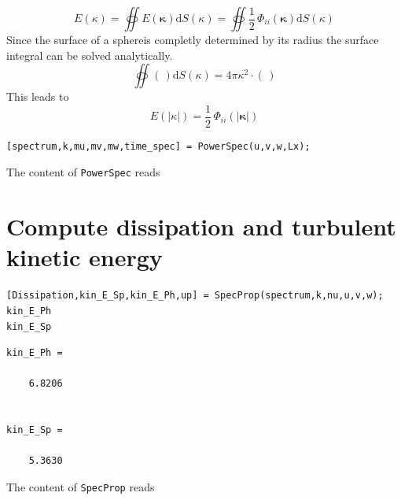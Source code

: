 \documentclass[preprint,12pt,ntfdMod]{elsarticle}
\begin{document}
\begin{par}

  \begin{equation}
      E(\kappa) = \oiint E(\boldsymbol\kappa)\mathrm{d}S(\kappa)
                = \oiint \frac{1}{2}\,\Phi_{ii}(\boldsymbol\kappa)\mathrm{d}S(\kappa)
  \end{equation}
  Since the surface of a sphereis completly determined by its radius the
  surface integral can be solved analytically.
  \begin{equation}
      \oiint(\,)\mathrm{d}S(\kappa) = 4\pi\kappa^2\cdot(\,)
  \end{equation}
This leads to
  \begin{equation}
      E(|\kappa|) = \frac{1}{2}\,\Phi_{ii}(|\boldsymbol\kappa|)
  \end{equation}

\end{par} \vspace{1em}
\begin{lstlisting}
[spectrum,k,mu,mv,mw,time_spec] = PowerSpec(u,v,w,Lx);
\end{lstlisting}
\begin{par}

The content of \verb|PowerSpec| reads


\end{par} \vspace{1em}


\section{Compute dissipation and turbulent kinetic energy}

\begin{lstlisting}
[Dissipation,kin_E_Sp,kin_E_Ph,up] = SpecProp(spectrum,k,nu,u,v,w);
kin_E_Ph
kin_E_Sp
\end{lstlisting}

        \color{lightgray} \begin{lstlisting}
kin_E_Ph =

    6.8206


kin_E_Sp =

    5.3630

\end{lstlisting} \color{black}
    \begin{par}

The content of \verb|SpecProp| reads


\end{par} \vspace{1em}
\end{document}
